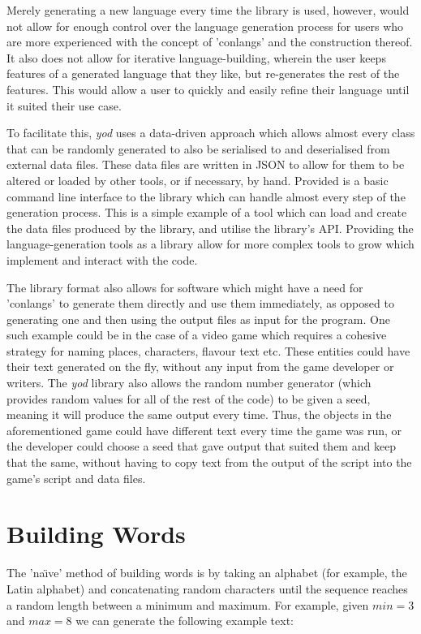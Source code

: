 \documentclass{report}
\begin{document}
   Merely generating a new language every time the library is used, however, would not allow for enough control over the language generation process for users who are more experienced with the concept of 'conlangs' and the construction thereof. It also does not allow for iterative language-building, wherein the user keeps features of a generated language that they like, but re-generates the rest of the features. This would allow a user to quickly and easily refine their language until it suited their use case.
   
   To facilitate this, \textit{yod} uses a data-driven approach which allows almost every class that can be randomly generated to also be serialised to and deserialised from external data files. These data files are written in JSON to allow for them to be altered or loaded by other tools, or if necessary, by hand. Provided is a basic command line interface to the library which can handle almost every step of the generation process. This is a simple example of a tool which can load and create the data files produced by the library, and utilise the library's API. Providing the language-generation tools as a library allow for more complex tools to grow which implement and interact with the code.
   
   The library format also allows for software which might have a need for 'conlangs' to generate them directly and use them immediately, as opposed to generating one and then using the output files as input for the program. One such example could be in the case of a video game which requires a cohesive strategy for naming places, characters, flavour text etc. These entities could have their text generated on the fly, without any input from the game developer or writers. The \textit{yod} library also allows the random number generator (which provides random values for all of the rest of the code) to be given a seed, meaning it will produce the same output every time. Thus, the objects in the aforementioned game could have different text every time the game was run, or the developer could choose a seed that gave output that suited them and keep that the same, without having to copy text from the output of the script into the game's script and data files.
   
   
   \chapter{Building Words}
   The 'na\"{\i}ve' method of building words is by taking an alphabet (for example, the Latin alphabet) and concatenating random characters until the sequence reaches a random length between a minimum and maximum. For example, given $min = 3$ and $max = 8$ we can generate the following example text:
   
\end{document}
